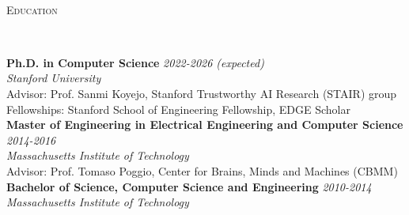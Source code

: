 \documentclass{article}
\newenvironment{changemargin}[2]{%
  \begin{list}{}{%
    \setlength{\topsep}{0pt}%
    \setlength{\leftmargin}{#1}%
    \setlength{\rightmargin}{#2}%
    \setlength{\listparindent}{\parindent}%
    \setlength{\itemindent}{\parindent}%
    \setlength{\parsep}{\parskip}%
  }%
  \item[]}{\end{list}
}
\newcommand{\lineover}{
	\begin{changemargin}{-0.05in}{-0.05in}
		\vspace*{-8pt}
		\hrulefill \\
		\vspace*{-2pt}
	\end{changemargin}
}
\newcommand{\header}[1]{
	\begin{changemargin}{-0.5in}{-0.5in}
		\scshape{#1}\\
  	\lineover
	\end{changemargin}
}
\newenvironment{body} {
	\vspace*{-16pt}
	\begin{changemargin}{-0.25in}{-0.5in}
  }	
	{\end{changemargin}
}
\begin{document}

\begin{changemargin}{-0.5in}{-0.5in}
\\ 
\vspace{10 pt}
\end{changemargin}


\header{Education}

\begin{body}
	\vspace{14pt}
	\textbf{Ph.D. in Computer Science} \hfill \emph{2022-2026 (expected)}\\
	\emph{Stanford University} \hfill {}\\
	Advisor: Prof. Sanmi Koyejo, Stanford Trustworthy AI Research (STAIR) group\\
	Fellowships: Stanford School of Engineering Fellowship, EDGE Scholar\\
	\textbf{Master of Engineering in Electrical Engineering and Computer Science} \hfill \emph{2014-2016}\\
	\emph{Massachusetts Institute of Technology} \hfill {}\\
	Advisor: Prof. Tomaso Poggio, Center for Brains, Minds and Machines (CBMM)\\
	\textbf{Bachelor of Science, Computer Science and Engineering} \hfill \emph{2010-2014} \\
	\emph{Massachusetts Institute of Technology} \hfill {}\\
\end{body}

\smallskip
\end{document}
